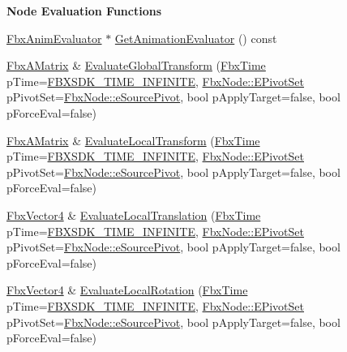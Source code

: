 \begin{Indent}\textbf{ Node Evaluation Functions}\par
\begin{DoxyCompactItemize}
\item 
\hyperlink{class_fbx_anim_evaluator}{Fbx\+Anim\+Evaluator} $\ast$ \hyperlink{class_fbx_node_a67423ff791f208b8eb01c173b1c6e309}{Get\+Animation\+Evaluator} () const
\item 
\hyperlink{class_fbx_a_matrix}{Fbx\+A\+Matrix} \& \hyperlink{class_fbx_node_a534da99b3ad911158013482a1b08f630}{Evaluate\+Global\+Transform} (\hyperlink{class_fbx_time}{Fbx\+Time} p\+Time=\hyperlink{fbxtime_8h_a1e6db3fe0f84f0b7daa775739f93526f}{F\+B\+X\+S\+D\+K\+\_\+\+T\+I\+M\+E\+\_\+\+I\+N\+F\+I\+N\+I\+TE}, \hyperlink{class_fbx_node_ae62b7311ac4727654cdf1ebd5cbf7343}{Fbx\+Node\+::\+E\+Pivot\+Set} p\+Pivot\+Set=\hyperlink{class_fbx_node_ae62b7311ac4727654cdf1ebd5cbf7343ae8ed37a5c7e41f8d1cec9d3fa8424b69}{Fbx\+Node\+::e\+Source\+Pivot}, bool p\+Apply\+Target=false, bool p\+Force\+Eval=false)
\item 
\hyperlink{class_fbx_a_matrix}{Fbx\+A\+Matrix} \& \hyperlink{class_fbx_node_a09172819cab2019ea3088a8aca9fb56b}{Evaluate\+Local\+Transform} (\hyperlink{class_fbx_time}{Fbx\+Time} p\+Time=\hyperlink{fbxtime_8h_a1e6db3fe0f84f0b7daa775739f93526f}{F\+B\+X\+S\+D\+K\+\_\+\+T\+I\+M\+E\+\_\+\+I\+N\+F\+I\+N\+I\+TE}, \hyperlink{class_fbx_node_ae62b7311ac4727654cdf1ebd5cbf7343}{Fbx\+Node\+::\+E\+Pivot\+Set} p\+Pivot\+Set=\hyperlink{class_fbx_node_ae62b7311ac4727654cdf1ebd5cbf7343ae8ed37a5c7e41f8d1cec9d3fa8424b69}{Fbx\+Node\+::e\+Source\+Pivot}, bool p\+Apply\+Target=false, bool p\+Force\+Eval=false)
\item 
\hyperlink{class_fbx_vector4}{Fbx\+Vector4} \& \hyperlink{class_fbx_node_a657ee59a92e8d6215214f6ac8880942b}{Evaluate\+Local\+Translation} (\hyperlink{class_fbx_time}{Fbx\+Time} p\+Time=\hyperlink{fbxtime_8h_a1e6db3fe0f84f0b7daa775739f93526f}{F\+B\+X\+S\+D\+K\+\_\+\+T\+I\+M\+E\+\_\+\+I\+N\+F\+I\+N\+I\+TE}, \hyperlink{class_fbx_node_ae62b7311ac4727654cdf1ebd5cbf7343}{Fbx\+Node\+::\+E\+Pivot\+Set} p\+Pivot\+Set=\hyperlink{class_fbx_node_ae62b7311ac4727654cdf1ebd5cbf7343ae8ed37a5c7e41f8d1cec9d3fa8424b69}{Fbx\+Node\+::e\+Source\+Pivot}, bool p\+Apply\+Target=false, bool p\+Force\+Eval=false)
\item 
\hyperlink{class_fbx_vector4}{Fbx\+Vector4} \& \hyperlink{class_fbx_node_a7c0334aa463a372d1536d837d08796ee}{Evaluate\+Local\+Rotation} (\hyperlink{class_fbx_time}{Fbx\+Time} p\+Time=\hyperlink{fbxtime_8h_a1e6db3fe0f84f0b7daa775739f93526f}{F\+B\+X\+S\+D\+K\+\_\+\+T\+I\+M\+E\+\_\+\+I\+N\+F\+I\+N\+I\+TE}, \hyperlink{class_fbx_node_ae62b7311ac4727654cdf1ebd5cbf7343}{Fbx\+Node\+::\+E\+Pivot\+Set} p\+Pivot\+Set=\hyperlink{class_fbx_node_ae62b7311ac4727654cdf1ebd5cbf7343ae8ed37a5c7e41f8d1cec9d3fa8424b69}{Fbx\+Node\+::e\+Source\+Pivot}, bool p\+Apply\+Target=false, bool p\+Force\+Eval=false)

\end{DoxyCompactItemize}
\end{Indent}
